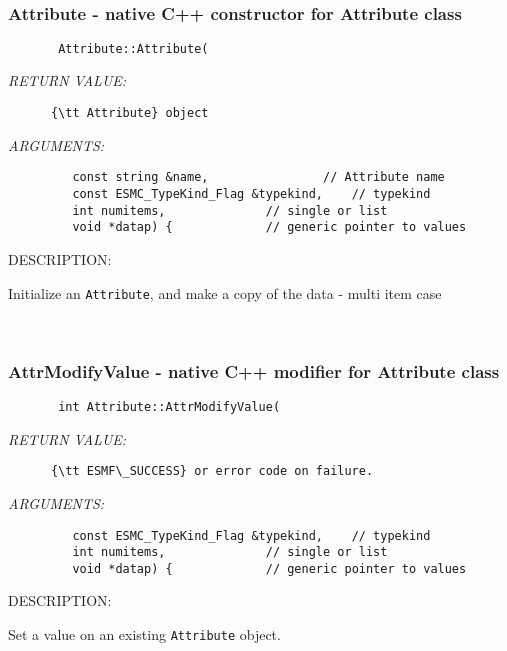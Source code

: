 \mbox{}\hrulefill\
 
\subsubsection [Attribute] {Attribute - native C++ constructor for Attribute class}


  
\begin{verbatim}       Attribute::Attribute(\end{verbatim}{\em RETURN VALUE:}
\begin{verbatim}      {\tt Attribute} object\end{verbatim}{\em ARGUMENTS:}
\begin{verbatim}         const string &name,                // Attribute name
         const ESMC_TypeKind_Flag &typekind,    // typekind
         int numitems,              // single or list
         void *datap) {             // generic pointer to values\end{verbatim}
{\sf DESCRIPTION:\\ }


     Initialize an {\tt Attribute}, and make a copy of the data - multi item case
   
 
\mbox{}\hrulefill\
 
\subsubsection [AttrModifyValue] {AttrModifyValue - native C++ modifier for Attribute class}


  
\begin{verbatim}       int Attribute::AttrModifyValue(\end{verbatim}{\em RETURN VALUE:}
\begin{verbatim}      {\tt ESMF\_SUCCESS} or error code on failure.\end{verbatim}{\em ARGUMENTS:}
\begin{verbatim}         const ESMC_TypeKind_Flag &typekind,    // typekind
         int numitems,              // single or list
         void *datap) {             // generic pointer to values\end{verbatim}
{\sf DESCRIPTION:\\ }


     Set a value on an existing {\tt Attribute} object.
   
